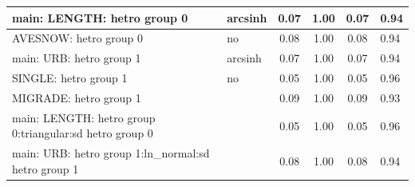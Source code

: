 \begin{table}
\begin{center}
\begin{tabular}{|l|l|c|c|c|l|}
			\hline
			main: LENGTH: hetro group 0 & arcsinh & 0.07 & 1.00 & 0.07 & 0.94 \\
			\hline
			AVESNOW: hetro group 0 & no & 0.08 & 1.00 & 0.08 & 0.94 \\
			\hline
			main: URB: hetro group 1 & arcsinh & 0.07 & 1.00 & 0.07 & 0.94 \\
			\hline
			SINGLE: hetro group 1 & no & 0.05 & 1.00 & 0.05 & 0.96 \\
			\hline
			MIGRADE: hetro group 1 &  & 0.09 & 1.00 & 0.09 & 0.93 \\
			\hline
			main: LENGTH: hetro group 0:triangular:sd  hetro group 0 &  & 0.05 & 1.00 & 0.05 & 0.96 \\
			\hline
			main: URB: hetro group 1:ln_normal:sd  hetro group 1 &  & 0.08 & 1.00 & 0.08 & 0.94 \\
			\hline
		\end{tabular}
	\end{center}
\end{table}